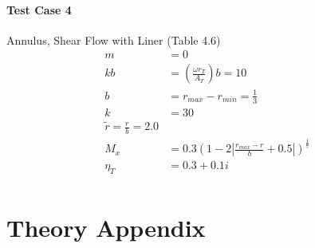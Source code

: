 \documentclass[12pt]{uthesis-v12}  %
\begin{document}
\subsubsection{Test Case 4}
\subitem Annulus, Shear Flow with Liner (Table 4.6)
\begin{align*}
    m &= 0 \\
    kb &= \left(\frac{\omega r_T}{A_T}\right)b = 10 \\
    b &= r_{max} - r_{min}  = \frac{1}{3}\\
    k &= 30 \\
    \tilde{r} = \frac{r}{b} = 2.0 \\
    M_x &= 0.3\left(1 - 2 \left| \frac{r_{max}-r}{b} + 0.5 \right|  \right)^{\frac{1}{7}} \\
    \eta_T &= 0.3 + 0.1i\\
\end{align*}






\appendix
\chapter{Theory Appendix}
\end{document}
